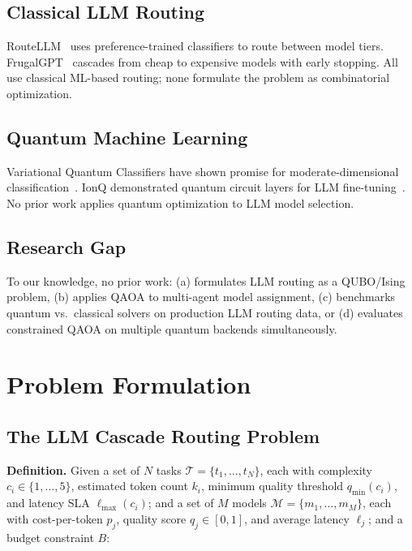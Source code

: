 \documentclass[conference]{IEEEtran}
\begin{document}
\subsection{Classical LLM Routing}

RouteLLM~\cite{ong2024routellm} uses preference-trained classifiers to route between model tiers. FrugalGPT~\cite{chen2023frugalgpt} cascades from cheap to expensive models with early stopping. All use classical ML-based routing; none formulate the problem as combinatorial optimization.

\subsection{Quantum Machine Learning}

Variational Quantum Classifiers have shown promise for moderate-dimensional classification~\cite{havlicek2019supervised}. IonQ demonstrated quantum circuit layers for LLM fine-tuning~\cite{ionq2025}. No prior work applies quantum optimization to LLM model selection.

\subsection{Research Gap}

To our knowledge, no prior work: (a) formulates LLM routing as a QUBO/Ising problem, (b) applies QAOA to multi-agent model assignment, (c) benchmarks quantum vs.\ classical solvers on production LLM routing data, or (d) evaluates constrained QAOA on multiple quantum backends simultaneously.

\section{Problem Formulation}

\subsection{The LLM Cascade Routing Problem}

\textbf{Definition.} Given a set of $N$ tasks $\mathcal{T} = \{t_1, \ldots, t_N\}$, each with complexity $c_i \in \{1,\ldots,5\}$, estimated token count $k_i$, minimum quality threshold $q_{\min}(c_i)$, and latency SLA $\ell_{\max}(c_i)$; and a set of $M$ models $\mathcal{M} = \{m_1, \ldots, m_M\}$, each with cost-per-token $p_j$, quality score $q_j \in [0,1]$, and average latency $\ell_j$; and a budget constraint $B$:
\end{document}
